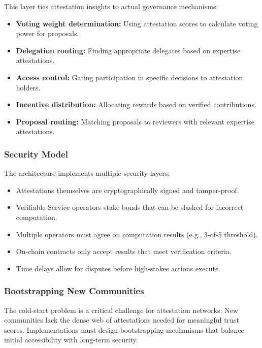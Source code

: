 This layer ties attestation insights to actual governance mechanisms:

\begin{itemize}
\item \textbf{Voting weight determination:} Using attestation scores to calculate voting power for proposals.
\item \textbf{Delegation routing:} Finding appropriate delegates based on expertise attestations.
\item \textbf{Access control:} Gating participation in specific decisions to attestation holders.
\item \textbf{Incentive distribution:} Allocating rewards based on verified contributions.
\item \textbf{Proposal routing:} Matching proposals to reviewers with relevant expertise attestations.
\end{itemize}

\subsubsection{Security Model}

The architecture implements multiple security layers:

\begin{itemize}
\item Attestations themselves are cryptographically signed and tamper-proof.
\item Verifiable Service operators stake bonds that can be slashed for incorrect computation.
\item Multiple operators must agree on computation results (e.g., 3-of-5 threshold).
\item On-chain contracts only accept results that meet verification criteria.
\item Time delays allow for disputes before high-stakes actions execute.
\end{itemize}

\subsubsection{Bootstrapping New Communities}

The cold-start problem is a critical challenge for attestation networks. New communities lack the dense web of attestations needed for meaningful trust scores. Implementations must design bootstrapping mechanisms that balance initial accessibility with long-term security.

